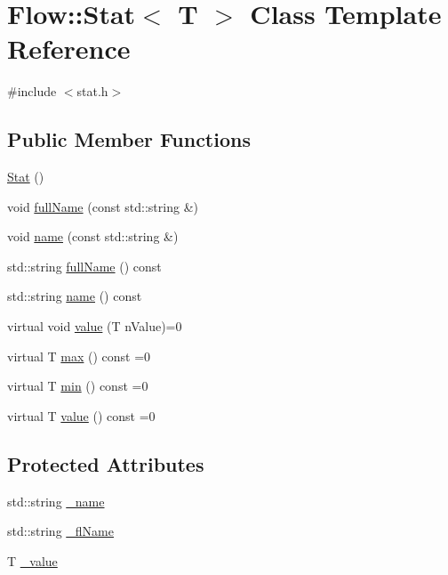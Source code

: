 \hypertarget{class_flow_1_1_stat}{}\section{Flow\+:\+:Stat$<$ T $>$ Class Template Reference}
\label{class_flow_1_1_stat}


{\ttfamily \#include $<$stat.\+h$>$}

\subsection*{Public Member Functions}
\begin{DoxyCompactItemize}
\item 
\hyperlink{class_flow_1_1_stat_ab9619eea9fbadcdc6c16eb371344d6d9}{Stat} ()
\item 
void \hyperlink{class_flow_1_1_stat_a1a04573bbc533a2d5af98ec708a060ca}{full\+Name} (const std\+::string \&)
\item 
void \hyperlink{class_flow_1_1_stat_acb4d3c7aeaf3e74166dcf3ae8bae623c}{name} (const std\+::string \&)
\item 
std\+::string \hyperlink{class_flow_1_1_stat_adbd9f33d895447e503a42ec4d270f4b4}{full\+Name} () const
\item 
std\+::string \hyperlink{class_flow_1_1_stat_a189a887c27df8b70987df310cee98337}{name} () const
\item 
virtual void \hyperlink{class_flow_1_1_stat_ab28bdb79f7d6444f1e341a62ef039b96}{value} (T n\+Value)=0
\item 
virtual T \hyperlink{class_flow_1_1_stat_a61757491d2145c37460a1cd32a8db8bb}{max} () const =0
\item 
virtual T \hyperlink{class_flow_1_1_stat_a7cf2be39e64fb4da988b604b92a85d28}{min} () const =0
\item 
virtual T \hyperlink{class_flow_1_1_stat_a8861df6366e182078ea6c9bac2b718e2}{value} () const =0
\end{DoxyCompactItemize}
\subsection*{Protected Attributes}
\begin{DoxyCompactItemize}
\item 
std\+::string \hyperlink{class_flow_1_1_stat_ad85647ec1e66fd927a9e15755fc9f3c1}{\+\_\+name}
\item 
std\+::string \hyperlink{class_flow_1_1_stat_a6e6f57fcab4840d6ed92639f017b8e0c}{\+\_\+fl\+Name}
\item 
T \hyperlink{class_flow_1_1_stat_aba908d9094479b62f72a9663ba25232b}{\+\_\+value}
\end{DoxyCompactItemize}


